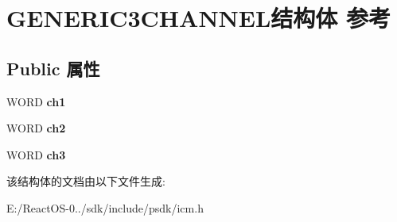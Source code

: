 \hypertarget{struct_g_e_n_e_r_i_c3_c_h_a_n_n_e_l}{}\section{G\+E\+N\+E\+R\+I\+C3\+C\+H\+A\+N\+N\+E\+L结构体 参考}
\label{struct_g_e_n_e_r_i_c3_c_h_a_n_n_e_l}
\subsection*{Public 属性}
\begin{DoxyCompactItemize}
\item 
\mbox{\label{struct_g_e_n_e_r_i_c3_c_h_a_n_n_e_l_a7f8f8fb21a9a32a32883bab41cb09543}} 
W\+O\+RD {\bfseries ch1}
\item 
\mbox{\label{struct_g_e_n_e_r_i_c3_c_h_a_n_n_e_l_adae99bd519aa79d22892ec85a799d544}} 
W\+O\+RD {\bfseries ch2}
\item 
\mbox{\label{struct_g_e_n_e_r_i_c3_c_h_a_n_n_e_l_afc5cb19a7637e074cb522e404c723eed}} 
W\+O\+RD {\bfseries ch3}
\end{DoxyCompactItemize}


该结构体的文档由以下文件生成\+:\begin{DoxyCompactItemize}
\item 
E\+:/\+React\+O\+S-\/0../sdk/include/psdk/icm.\+h\end{DoxyCompactItemize}
